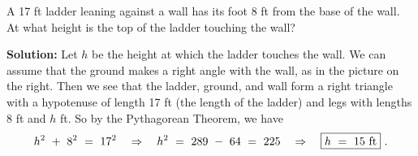 \begin{exmp}
\noindent A 17 ft ladder leaning against a wall has its foot 8 ft from the base of the wall. At what height
 is the top of the ladder touching the wall?\vspace{1mm}
\par\noindent\textbf{Solution:} Let $h$ be the height at which the ladder touches the wall. We can
assume that the ground makes a right angle with the wall, as in the picture on the right. Then we
see that the ladder, ground, and wall form a right triangle with a hypotenuse of length 17 ft (the
length of the ladder) and legs with lengths 8 ft and $h$ ft. So by the Pythagorean Theorem, we have
\begin{displaymath}
 h^2 ~+~ 8^2 ~=~ 17^2 \quad\Rightarrow\quad h^2 ~=~ 289 ~-~ 64 ~=~ 225 \quad\Rightarrow\quad
 \fbox{$h ~=~ 15 ~\text{ft}$} ~.
\end{displaymath}
\end{exmp}\vspace{-3mm}
\divider
\vspace{3mm}

